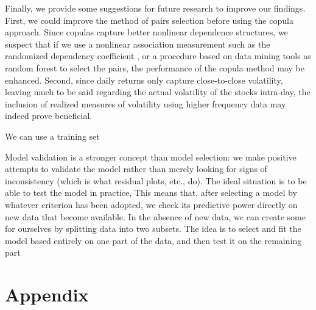 \documentclass[a4paper]{article}
\begin{document}
	Finally, we provide some suggestions for future research to improve our findings. First, we could improve the method of pairs selection before using the copula approach. Since copulas capture better nonlinear dependence structures, we suspect that if we use a nonlinear association measurement such as the randomized dependency coefficient \citep{lopez2013randomized}, or a procedure based on data mining tools as random forest \citep{dlrz10} to select the pairs, the performance of the copula method may be enhanced. Second, since daily returns only capture close-to-close volatility, leaving much to be said regarding the actual volatility of the stocks intra-day, the inclusion of realized measures of volatility using higher frequency data may indeed prove beneficial.
	
	We can use a training set
	
	Model validation is a stronger concept than model selection: we make positive attempts to validate the model rather than merely looking for signs of inconsistency (which is what residual plots, etc., do). The ideal situation is to be able to test the model in practice, This means that, after selecting a model by whatever criterion has been adopted, we check its predictive power directly on new data that become available. In the absence of new data, we can create some for ourselves by splitting data into two subsets. The idea is to select and fit the model based entirely on one part of the data, and then test it on the remaining part
	
	
	
	
	\newpage
	
	\section*{Appendix}
	\vspace{0.6cm}
	
	
	
\end{document}

